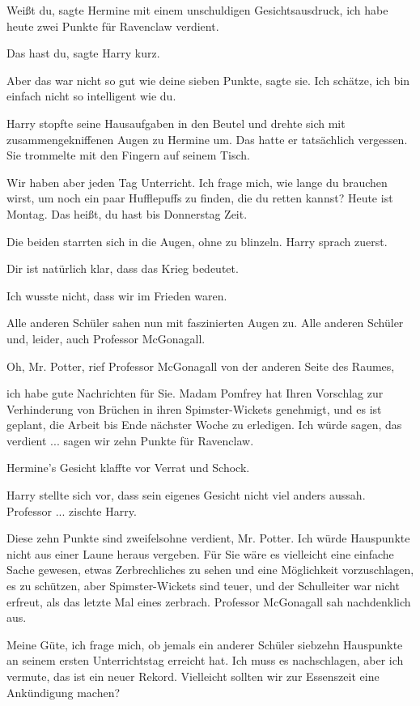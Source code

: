 \glqq{}Weißt du\grqq{}, sagte Hermine mit einem unschuldigen Gesichtsausdruck,
\glqq{}ich habe heute zwei Punkte für Ravenclaw verdient.\grqq{}

\glqq{}Das hast du\grqq{}, sagte Harry kurz.

\glqq{}Aber das war nicht so gut wie deine sieben Punkte\grqq{}, sagte sie.
\glqq{}Ich schätze, ich bin einfach nicht so intelligent wie du.\grqq{}

Harry stopfte seine Hausaufgaben in den Beutel und drehte sich mit
zusammengekniffenen Augen zu Hermine um. Das hatte er tatsächlich vergessen. Sie
trommelte mit den Fingern auf seinem Tisch.

\glqq{}Wir haben aber jeden Tag Unterricht. Ich frage mich, wie lange du brauchen
wirst, um noch ein paar Hufflepuffs zu finden, die du retten kannst? Heute ist
Montag. Das heißt, du hast bis Donnerstag Zeit.\grqq{}

Die beiden starrten sich in die Augen, ohne zu blinzeln. Harry sprach zuerst.

\glqq{}Dir ist natürlich klar, dass das Krieg bedeutet.\grqq{}

\glqq{}Ich wusste nicht, dass wir im Frieden waren.\grqq{}

Alle anderen Schüler sahen nun mit faszinierten Augen zu. Alle anderen Schüler
und, leider, auch Professor McGonagall.

\glqq{}Oh, Mr. Potter\grqq{}, rief Professor McGonagall von der anderen Seite
des Raumes,

\glqq{}ich habe gute Nachrichten für Sie. Madam Pomfrey hat Ihren Vorschlag zur
Verhinderung von Brüchen in ihren Spimster-Wickets genehmigt, und es ist
geplant, die Arbeit bis Ende nächster Woche zu erledigen. Ich würde sagen, das
verdient ... sagen wir zehn Punkte für Ravenclaw.\grqq{}

Hermine's Gesicht klaffte vor Verrat und Schock.

Harry stellte sich vor, dass sein eigenes Gesicht nicht viel anders aussah.
\glqq{}Professor ...\grqq{} zischte Harry.

\glqq{}Diese zehn Punkte sind zweifelsohne verdient, Mr. Potter. Ich würde
Hauspunkte nicht aus einer Laune heraus vergeben. Für Sie wäre es vielleicht
eine einfache Sache gewesen, etwas Zerbrechliches zu sehen und eine Möglichkeit
vorzuschlagen, es zu schützen, aber Spimster-Wickets sind teuer, und der
Schulleiter war nicht erfreut, als das letzte Mal eines zerbrach. Professor
McGonagall sah nachdenklich aus.

\glqq{}Meine Güte, ich frage mich, ob jemals ein anderer Schüler siebzehn
Hauspunkte an seinem ersten Unterrichtstag erreicht hat. Ich muss es
nachschlagen, aber ich vermute, das ist ein neuer Rekord. Vielleicht sollten wir
zur Essenszeit eine Ankündigung machen?\grqq{}

